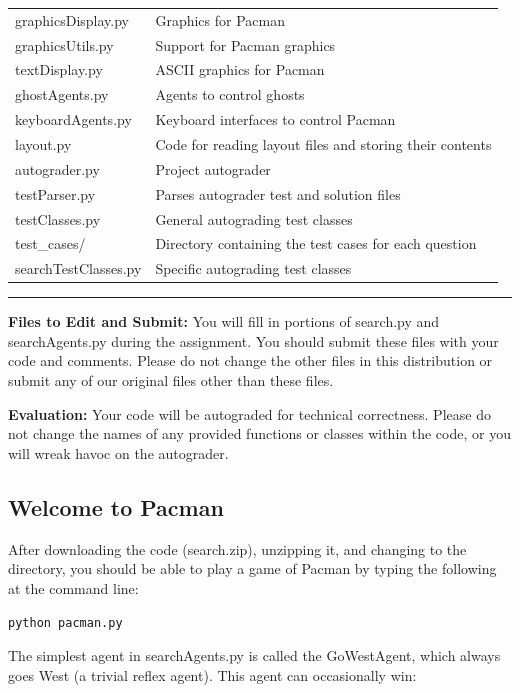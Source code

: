 \documentclass[a4paper, 11pt]{article}
\begin{document}
\begin{tabular}{ll}
  \textsf{graphicsDisplay.py} &	Graphics for Pacman\\
  \textsf{graphicsUtils.py} &	Support for Pacman graphics\\
  \textsf{textDisplay.py} &	ASCII graphics for Pacman\\
  \textsf{ghostAgents.py} &	Agents to control ghosts\\
  \textsf{keyboardAgents.py} &	Keyboard interfaces to control Pacman\\
  \textsf{layout.py} &	Code for reading layout files and storing their contents\\
  \textsf{autograder.py} &	Project autograder\\
  \textsf{testParser.py} &	Parses autograder test and solution files\\
  \textsf{testClasses.py} &	General autograding test classes\\
  \textsf{test\_cases/} &	Directory containing the test cases for each question\\
  \textsf{searchTestClasses.py} &	Specific autograding test classes\\
\end{tabular}

\rule{\textwidth}{0.5pt}

\textbf{Files to Edit and Submit:} You will fill in portions of \textsf{search.py} and \textsf{searchAgents.py} during the assignment. You should submit these files with your code and comments. Please do not change the other files in this distribution or submit any of our original files other than these files.

\textbf{Evaluation:} Your code will be autograded for technical correctness. Please do not change the names of any provided functions or classes within the code, or you will wreak havoc on the autograder. 
\subsection{Welcome to Pacman}
After downloading the code (search.zip), unzipping it, and changing to the directory, you should be able to play a game of Pacman by typing the following at the command line:

\texttt{python pacman.py}

The simplest agent in \textsf{searchAgents.py} is called the \textsf{GoWestAgent}, which always goes West (a trivial reflex agent). This agent can occasionally win:
\end{document}
